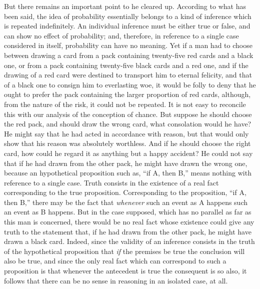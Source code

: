 But there remains an important point to he cleared up. According to what has been said, the idea of probability essentially belongs to a kind of inference which is repeated indefinitely. An individual inference must be either true or false, and can show no effect of probability; and, therefore, in reference to a single case considered in itself, probability can have no meaning. Yet if a man had to choose between drawing a card from a pack containing twenty-five red cards and a black one, or from a pack containing twenty-five black cards and a red one, and if the drawing of a red card were destined to transport him to eternal felicity, and that of a black one to consign him to everlasting woe, it would be folly to deny that he ought to prefer the pack containing the larger proportion of red cards, although, from the nature of the risk, it could not be repeated. It is not easy to reconcile this with our analysis of the conception of chance. But suppose he should choose the red pack, and should draw the wrong card, what consolation would he have? He might say that he had acted in accordance with reason, but that would only show that his reason was absolutely worthless. And if he should choose the right card, how could he regard it as anything but a happy accident? He could not say that if he had drawn from the other pack, he might have drawn the wrong one, because an hypothetical proposition such as, ``if A, then B,'' means nothing with reference to a single case. Truth consists in the existence of a real fact corresponding to the true proposition. Corresponding to the proposition, ``if A, then B,'' there may be the fact that \emph{whenever} such an event as A happens such an event as B happens. But in the case supposed, which has no parallel as far as this man is concerned, there would be no real fact whose existence could give any truth to the statement that, if he had drawn from the other pack, he might have drawn a black card. Indeed, since the validity of an inference consists in the truth of the hypothetical proposition that \emph{if} the premises be true the conclusion will also be true, and since the only real fact which can correspond to such a proposition is that whenever the antecedent is true the consequent is so also, it follows that there can be no sense in reasoning in an isolated case, at all.


